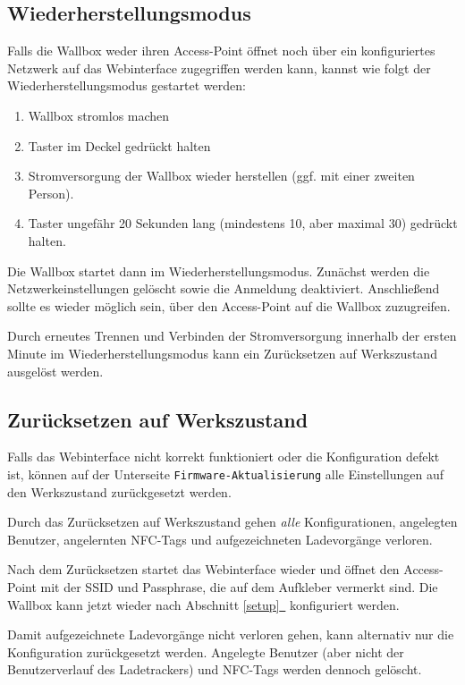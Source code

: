 \documentclass[a4paper,10pt]{article}
\newcommand{\hint}[1]{\begin{tcolorbox}[colback=boxgray,colframe=black,coltext=
white,title=Hinweis,left*=2mm,right*=2mm,boxsep=1mm,bottom=1mm,top=1mm]#1\end{tcolorbox}}
\newcommand*{\fullref}[1]{Abschnitt \hyperref[{#1}]{\ref*{#1}~\nameref*{#1}}}
\begin{document}
\begin{multicols*}{2}
    \subsection{Wiederherstellungsmodus}\label{recovery}
    Falls die Wallbox weder ihren Access-Point öffnet noch über ein konfiguriertes Netzwerk auf das Webinterface zugegriffen werden kann,
    kannst wie folgt der Wiederherstellungsmodus gestartet werden:
    \begin{enumerate}
     \item Wallbox stromlos machen
     \item Taster im Deckel gedrückt halten
     \item Stromversorgung der Wallbox wieder herstellen (ggf. mit einer zweiten Person).
     \item Taster ungefähr 20 Sekunden lang (mindestens 10, aber maximal 30) gedrückt halten.
    \end{enumerate}
    Die Wallbox startet dann im Wiederherstellungsmodus. Zunächst werden die Netzwerkeinstellungen gelöscht sowie die Anmeldung deaktiviert.
    Anschließend sollte es wieder möglich sein, über den Access-Point auf die Wallbox zuzugreifen.

    Durch erneutes Trennen und Verbinden der Stromversorgung innerhalb der ersten Minute im Wiederherstellungsmodus kann ein Zurücksetzen auf Werkszustand ausgelöst werden.

    \subsection{Zurücksetzen auf Werkszustand}\label{reset}
    Falls das Webinterface nicht korrekt funktioniert oder die Konfiguration defekt ist,
    können auf der Unterseite \texttt{Firmware-Aktualisierung} alle Einstellungen auf den Werkszustand zurückgesetzt werden.
    \hint{Durch das Zurücksetzen auf Werkszustand gehen \textit{alle} Konfigurationen, angelegten Benutzer, angelernten NFC-Tags und aufgezeichneten Ladevorgänge verloren.}
    Nach dem Zurücksetzen startet das Webinterface wieder und öffnet
    den Access-Point mit der SSID und Passphrase, die auf dem Aufkleber vermerkt
    sind. Die Wallbox kann jetzt wieder nach \fullref{setup} konfiguriert werden.

    Damit aufgezeichnete Ladevorgänge nicht verloren gehen, kann alternativ nur die Konfiguration zurückgesetzt werden.
    Angelegte Benutzer (aber nicht der Benutzerverlauf des Ladetrackers) und NFC-Tags werden dennoch gelöscht.


\end{multicols*}
\end{document}
